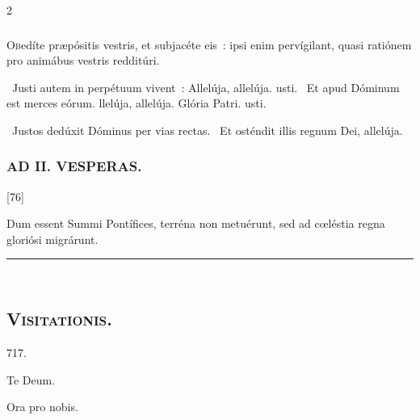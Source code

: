 \documentclass[9pt,twoside]{extarticle}
\begin{document}
\begin{multicols}{2}
{{\subsubsection*{}
\lettrine{O}bedíte præpósitis vestris, et subjacéte eis~: ipsi enim pervígilant, quasi ratiónem pro animábus vestris redditúri.

\begin{tightlist}{}
\item {}~Justi autem in perpétuum vivent~: \textred{*} Allelúja, allelúja. usti. ~Et apud Dóminum est merces eórum. llelúja, allelúja. Glória Patri. usti.
\item {}~Justos dedúxit Dóminus per vias rectas. ~Et osténdit illis regnum Dei, allelúja.
\end{tightlist}

\subsubsection*{\center \textsc{AD II. VESPERAS.}}
\begin{tightlist}{}
\item {} [76]
\item {}
\item {} Dum essent Summi Pontífices, terréna non metuérunt, sed ad cœléstia regna gloriósi migrárunt.
\item {}
\end{tightlist}

\begin{center}\textcolor{red}{\rule{\linewidth}{0.5pt}} \end{center}

\subsection*{\center \textsc{\\ Visitationis.}}
\begin{tightlist}{}
\item {} 717.
\item {}
\item Te Deum.
\item {} Ora pro nobis.
\end{tightlist}

}}
\end{multicols}
\end{document}
